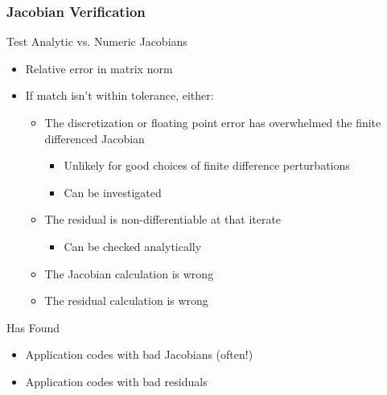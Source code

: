 \begin{frame}
\frametitle{Jacobian Verification}
\begin{block}{Test Analytic vs. Numeric Jacobians}
\begin{itemize}
\item Relative error in matrix norm
\item If match isn't within tolerance, either:
\begin{itemize}
\item The discretization or floating point error has overwhelmed the
finite differenced Jacobian 
\begin{itemize}
\item Unlikely for good choices of finite difference perturbations
\item Can be investigated
\end{itemize}
\item The residual is non-differentiable at that iterate
\begin{itemize}
\item Can be checked analytically
\end{itemize}
\item The Jacobian calculation is wrong
\item The residual calculation is wrong
\end{itemize}
\end{itemize}
\end{block}

\pause

\begin{block}{Has Found}
\begin{itemize}
\item Application codes with bad Jacobians (often!)
\item Application codes with bad residuals
\end{itemize}
\end{block}

\end{frame}

